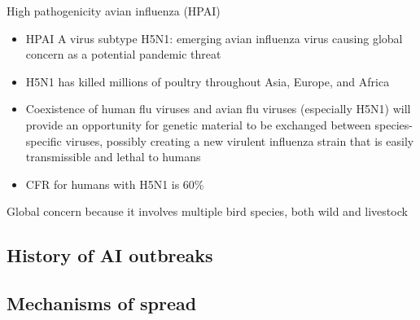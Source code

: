 \documentclass[aspectratio=43]{beamer}
\begin{document}
\begin{frame}{High pathogenicity avian influenza (HPAI)}
  \begin{itemize}
    \item HPAI A virus subtype H5N1: emerging avian influenza virus causing global concern as a potential pandemic threat
    \vfill
    \item H5N1 has killed millions of poultry throughout Asia, Europe, and Africa
    \vfill
    \item Coexistence of human flu viruses and avian flu viruses (especially H5N1) will provide an opportunity for genetic material to be exchanged between species-specific viruses, possibly creating a new virulent influenza strain that is easily transmissible and lethal to humans
    \vfill
    \item CFR for humans with H5N1 is 60\%
  \end{itemize}
\end{frame}

\begin{frame}
  Global concern because it involves multiple bird species, both wild and livestock
\end{frame}

\subsection{History of AI outbreaks}



\subsection{Mechanisms of spread}

\end{document}
